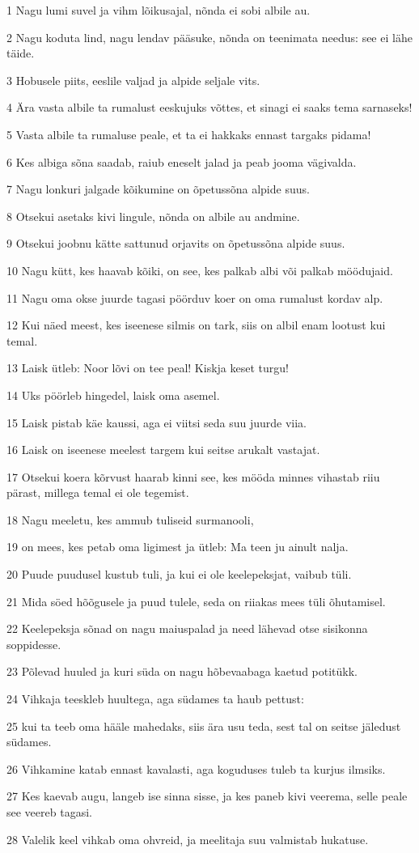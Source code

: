 \par 1 Nagu lumi suvel ja vihm lõikusajal, nõnda ei sobi albile au.
\par 2 Nagu koduta lind, nagu lendav pääsuke, nõnda on teenimata needus: see ei lähe täide.
\par 3 Hobusele piits, eeslile valjad ja alpide seljale vits.
\par 4 Ära vasta albile ta rumalust eeskujuks võttes, et sinagi ei saaks tema sarnaseks!
\par 5 Vasta albile ta rumaluse peale, et ta ei hakkaks ennast targaks pidama!
\par 6 Kes albiga sõna saadab, raiub eneselt jalad ja peab jooma vägivalda.
\par 7 Nagu lonkuri jalgade kõikumine on õpetussõna alpide suus.
\par 8 Otsekui asetaks kivi lingule, nõnda on albile au andmine.
\par 9 Otsekui joobnu kätte sattunud orjavits on õpetussõna alpide suus.
\par 10 Nagu kütt, kes haavab kõiki, on see, kes palkab albi või palkab möödujaid.
\par 11 Nagu oma okse juurde tagasi pöörduv koer on oma rumalust kordav alp.
\par 12 Kui näed meest, kes iseenese silmis on tark, siis on albil enam lootust kui temal.
\par 13 Laisk ütleb: Noor lõvi on tee peal! Kiskja keset turgu!
\par 14 Uks pöörleb hingedel, laisk oma asemel.
\par 15 Laisk pistab käe kaussi, aga ei viitsi seda suu juurde viia.
\par 16 Laisk on iseenese meelest targem kui seitse arukalt vastajat.
\par 17 Otsekui koera kõrvust haarab kinni see, kes mööda minnes vihastab riiu pärast, millega temal ei ole tegemist.
\par 18 Nagu meeletu, kes ammub tuliseid surmanooli,
\par 19 on mees, kes petab oma ligimest ja ütleb: Ma teen ju ainult nalja.
\par 20 Puude puudusel kustub tuli, ja kui ei ole keelepeksjat, vaibub tüli.
\par 21 Mida söed hõõgusele ja puud tulele, seda on riiakas mees tüli õhutamisel.
\par 22 Keelepeksja sõnad on nagu maiuspalad ja need lähevad otse sisikonna soppidesse.
\par 23 Põlevad huuled ja kuri süda on nagu hõbevaabaga kaetud potitükk.
\par 24 Vihkaja teeskleb huultega, aga südames ta haub pettust:
\par 25 kui ta teeb oma hääle mahedaks, siis ära usu teda, sest tal on seitse jäledust südames.
\par 26 Vihkamine katab ennast kavalasti, aga koguduses tuleb ta kurjus ilmsiks.
\par 27 Kes kaevab augu, langeb ise sinna sisse, ja kes paneb kivi veerema, selle peale see veereb tagasi.
\par 28 Valelik keel vihkab oma ohvreid, ja meelitaja suu valmistab hukatuse.

